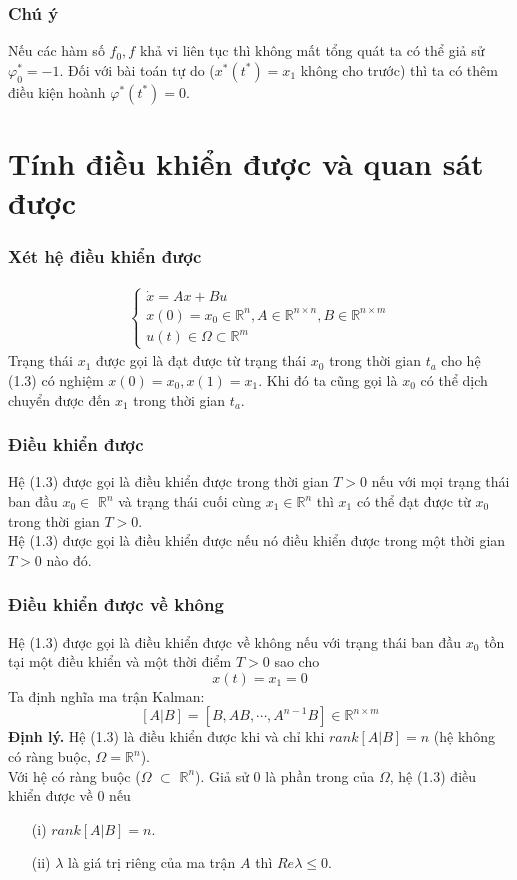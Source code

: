 \documentclass[12pt,a4paper]{report}
\begin{document}
\subsubsection{Chú ý} Nếu các hàm số $f_0,f$ khả vi liên tục thì không mất tổng quát ta có thể giả sử $\varphi
_0^*=-1$. Đối với bài toán tự do ($x^*(t^*) = x_1$ không cho trước) thì ta có thêm điều kiện hoành $\varphi
^*(t^*) = 0.$
\section{Tính điều khiển được và quan sát được}
\subsubsection{Xét hệ điều khiển được}
\begin{eqnarray}
	\begin{cases}
		\dot{x} = Ax + Bu \\ x(0) = x_0 \in \mathbb{R}^n, A \in \mathbb{R}^{n\times n}, B \in \mathbb{R}^{n\times m}\\u(t) \in \Omega \subset \mathbb{R}^m
	\end{cases}
\end{eqnarray}
Trạng thái $x_1$ được gọi là đạt được từ trạng thái $x_0$ trong thời gian $t_a$ cho hệ (1.3) có nghiệm $x(0)=x_0, x(1) = x_1$. Khi đó ta cũng gọi là $x_0$ có thể dịch chuyển được đến $x_1$ trong thời gian $t_a$.
\subsubsection{Điều khiển được} Hệ (1.3) được gọi là điều khiển được trong thời gian $T > 0$ nếu với mọi trạng thái ban đầu $x_0 \in$ $\mathbb{R}^n$ và trạng thái cuối cùng $x_1 \in \mathbb{R}^n$ thì $x_1$ có thể đạt được từ $x_0$  trong thời gian $T > 0.$
\\
Hệ (1.3) được gọi là điều khiển được nếu nó điều khiển được trong một thời gian $T > 0$ nào đó.
\subsubsection{Điều khiển được về không}
Hệ (1.3) được gọi là điều khiển được về không nếu với trạng thái ban đầu $x_0$ tồn tại một điều khiển và một thời điểm $T > 0$ sao cho $$x(t) = x_1=0$$ Ta định nghĩa ma trận Kalman: $$[A|B] = [B, AB, \cdots, A^{n-1}B] \in \mathbb{R}^{n\times m}$$
\textbf{Định lý.} Hệ (1.3) là điều khiển được khi và chỉ khi $rank [A|B] = n$ (hệ không có ràng buộc, $\Omega = \mathbb{R}^n$).\\ Với hệ có ràng buộc ($\Omega$ $\subset$ $\mathbb{R}^n$). Giả sử 0 là phần trong của $\Omega$, hệ (1.3) điều khiển được về 0 nếu 
\begin{itemize}
	\item[(i)] $rank [A|B] = n$.
	\item [(ii)] $\lambda$ là giá trị riêng của ma trận $A$ thì $Re\lambda \leq 0.$ 
\end{itemize}
\end{document}
